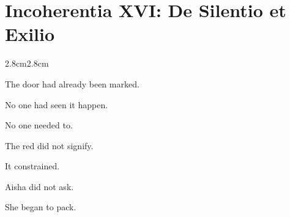 
\chapter*{Incoherentia XVI: De Silentio et Exilio}

\pagestyle{byobu-return}

\vspace{2em}

\begin{adjustwidth}{2.8cm}{2.8cm}

The door had already been marked.

\medskip

No one had seen it happen.

\medskip

No one needed to.

\vspace{2em}

The red did not signify.

\medskip

It constrained.

\vspace{3em}

\begin{center}
\end{center}

\vspace{3em}

Aisha did not ask.

\medskip

She began to pack.

\vspace{2em}

\end{adjustwidth}

